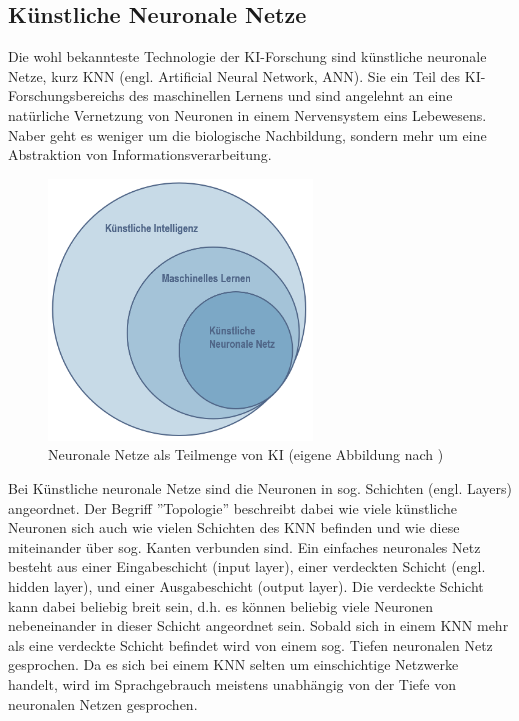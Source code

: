 \documentclass[a4paper,12pt, german]{report}
\begin{document}
\subsection{Künstliche Neuronale Netze}

Die wohl bekannteste Technologie der KI-Forschung sind künstliche neuronale Netze, kurz KNN (engl. Artificial Neural Network, ANN). Sie ein Teil des KI-Forschungsbereichs des maschinellen Lernens und sind angelehnt an eine natürliche Vernetzung von Neuronen in einem Nervensystem eins Lebewesens. Naber geht es weniger um die biologische Nachbildung, sondern mehr um eine Abstraktion von Informationsverarbeitung. 

\begin{figure}[H]
  \center
 \includegraphics[width=7cm]{images/EinordnungKNN.pptx.png}
  \caption[Neuronale Netze als Teilmenge von KI]{Neuronale Netze als Teilmenge von KI (eigene Abbildung nach \cite{17})}
\end{figure}

Bei Künstliche neuronale Netze sind die Neuronen in sog. Schichten (engl. Layers) angeordnet. Der Begriff ''Topologie'' beschreibt dabei wie viele künstliche Neuronen sich auch wie vielen Schichten des KNN befinden und wie diese miteinander über sog. Kanten verbunden sind. Ein einfaches neuronales Netz besteht aus einer Eingabeschicht (input layer), einer verdeckten Schicht (engl. hidden layer), und einer Ausgabeschicht (output layer). Die verdeckte Schicht kann dabei beliebig breit sein, d.h. es können beliebig viele Neuronen nebeneinander in dieser Schicht angeordnet sein. Sobald sich in einem KNN mehr als eine verdeckte Schicht befindet wird von einem sog. Tiefen neuronalen Netz gesprochen. Da es sich bei einem KNN selten um einschichtige Netzwerke handelt, wird im Sprachgebrauch meistens unabhängig von der Tiefe von neuronalen Netzen gesprochen. 
\end{document}
